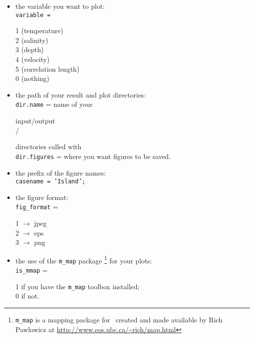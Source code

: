 \begin{itemize}

\item the variable you want to plot:\\
\texttt{variable =} \begin{minipage}[t]{6.6cm}
            1 (temperature)\\
            2 (salinity)\\
            3 (depth)\\
            4 (velocity)\\
            5 (correlation length)\\
            0 (nothing)
           \end{minipage}
           
\item the path of your result and plot directories:\\

\texttt{dir.name} = name of your  \begin{minipage}[t]{3cm}    input/output \\  / \end{minipage}  directories called with\\
\texttt{dir.figures} = where you want figures to be saved.

\item the prefix of the figure names:\\  
    
\texttt{casename = 'Island';}

\item the figure format:\\

\texttt{fig\_format} = \begin{minipage}[t]{5cm}
           1 $\rightarrow$ jpeg\\
           2 $\rightarrow$ eps\\
           3 $\rightarrow$ png
           \end{minipage}

\item the use of the \texttt{m\_map} package \footnote{\texttt{m\_map} is a mapping package for \matlab\, created and made available by Rich Pawlowicz at \url{http://www.eos.ubc.ca/~rich/map.html}} for your plots:\\

\texttt{is\_mmap} = \begin{minipage}[t]{5cm}
           1  if you have the \texttt{m\_map} toolbox installed;\\
           0  if not.
           \end{minipage}
\end{itemize}
 

